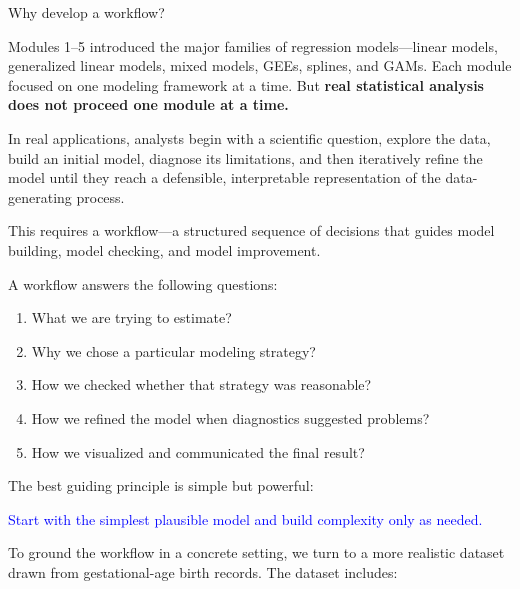 \documentclass[
  letterpaper,
  DIV=11,
  numbers=noendperiod]{scrreprt}
\begin{document}
\begin{tcolorbox}[enhanced jigsaw, breakable, colbacktitle=quarto-callout-important-color!10!white, left=2mm, colframe=quarto-callout-important-color-frame, opacityback=0, coltitle=black, colback=white, rightrule=.15mm, title=\textcolor{quarto-callout-important-color}{\faExclamation}\hspace{0.5em}{Motivation}, titlerule=0mm, opacitybacktitle=0.6, leftrule=.75mm, toprule=.15mm, arc=.35mm, bottomtitle=1mm, toptitle=1mm, bottomrule=.15mm]

Why develop a workflow?

Modules 1--5 introduced the major families of regression models---linear
models, generalized linear models, mixed models, GEEs, splines, and
GAMs. Each module focused on one modeling framework at a time. But
\textbf{real statistical analysis does not proceed one module at a
time.}

In real applications, analysts begin with a scientific question, explore
the data, build an initial model, diagnose its limitations, and then
iteratively refine the model until they reach a defensible,
interpretable representation of the data-generating process.

This requires a workflow---a structured sequence of decisions that
guides model building, model checking, and model improvement.

A workflow answers the following questions:

\begin{enumerate}
\def\labelenumi{\arabic{enumi}.}
\item
  What we are trying to estimate?
\item
  Why we chose a particular modeling strategy?
\item
  How we checked whether that strategy was reasonable?
\item
  How we refined the model when diagnostics suggested problems?
\item
  How we visualized and communicated the final result?
\end{enumerate}

The best guiding principle is simple but powerful:

\textcolor{blue}{Start with the simplest plausible model and build complexity only as needed.}

\end{tcolorbox}

To ground the workflow in a concrete setting, we turn to a more
realistic dataset drawn from gestational-age birth records. The dataset
includes:
\end{document}
